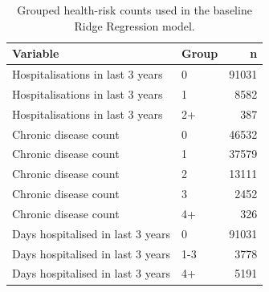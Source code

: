 \begin{table}
\caption{Grouped health-risk counts used in the baseline Ridge Regression model.}
\label{tab:03-ridge-group-counts}
\begin{tabular}{llr}
\toprule
Variable & Group & n \\
\midrule
Hospitalisations in last 3 years & 0 & 91031 \\
Hospitalisations in last 3 years & 1 & 8582 \\
Hospitalisations in last 3 years & 2+ & 387 \\
Chronic disease count & 0 & 46532 \\
Chronic disease count & 1 & 37579 \\
Chronic disease count & 2 & 13111 \\
Chronic disease count & 3 & 2452 \\
Chronic disease count & 4+ & 326 \\
Days hospitalised in last 3 years & 0 & 91031 \\
Days hospitalised in last 3 years & 1-3 & 3778 \\
Days hospitalised in last 3 years & 4+ & 5191 \\
\bottomrule
\end{tabular}
\end{table}
